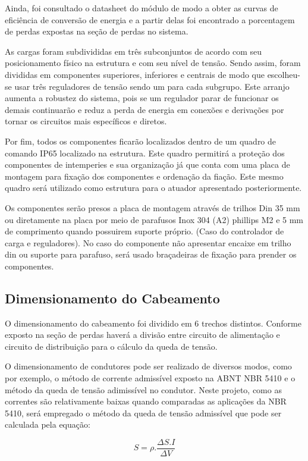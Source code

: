 Ainda, foi consultado o datasheet do módulo de modo a obter as curvas de eficiência de conversão de energia e a partir delas foi encontrado a porcentagem de perdas expostas na seção de perdas no sistema.

As cargas foram subdivididas em três subconjuntos de acordo com seu posicionamento físico na estrutura e com seu nível de tensão. Sendo assim, foram divididas em componentes superiores, inferiores e centrais  de modo que escolheu-se usar três reguladores de tensão sendo um para cada subgrupo. Este arranjo aumenta a robustez do sistema, pois se um regulador parar de funcionar os demais continuarão e reduz a perda de energia em conexões e derivações por tornar os circuitos mais específicos e diretos.

Por fim, todos os componentes ficarão localizados dentro de um quadro de comando IP65 localizado na estrutura. Este quadro permitirá a proteção dos componentes de intemperies e sua organização já que conta com uma placa de montagem para fixação dos componentes e ordenação da fiação. Este mesmo quadro será utilizado como estrutura para o atuador apresentado posteriormente.

Os componentes serão presos a placa de montagem através de trilhos Din 35 mm ou diretamente na placa por meio de parafusos Inox 304 (A2) phillips M2 e 5 mm de comprimento quando possuirem suporte próprio. (Caso do controlador de carga e reguladores). No caso do componente não apresentar encaixe em trilho din ou suporte para parafuso, será usado braçadeiras de fixação para prender os componentes.

\subsection{Dimensionamento do Cabeamento}

O dimensionamento do cabeamento foi dividido em 6 trechos distintos. Conforme exposto na seção de perdas haverá a divisão entre circuito de alimentação e circuito de distribuição para o cálculo da queda de tensão.

O dimensionamento de condutores pode ser realizado de diversos modos, como por exemplo, o método de corrente admissível exposto na ABNT NBR 5410 e o método da queda de tensão adimissível no condutor. Neste projeto, como as correntes são relativamente baixas quando comparadas as aplicações da NBR 5410, será empregado o método da queda de tensão admissível que pode ser calculada pela equação:

\begin{equation}
S = \rho . \dfrac{\Delta S . I}{\Delta V}
\end{equation}

